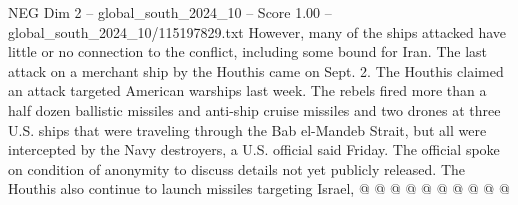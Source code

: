 \begin{textsample}{NEG Dim 2 – global\_south\_2024\_10 – Score 1.00 – global\_south\_2024\_10/115197829.txt}
However, many of the ships attacked have little or no connection to the conflict, including some bound for Iran.
The last attack on a merchant ship by the Houthis came on Sept. 2.
The Houthis claimed an attack targeted American warships last week.
The rebels fired more than a half dozen ballistic missiles and anti-ship cruise missiles and two drones at three U.S. ships that were traveling through the Bab el-Mandeb Strait, but all were intercepted by the Navy destroyers, a U.S. official said Friday.
The official spoke on condition of anonymity to discuss details not yet publicly released.
The Houthis also continue to launch missiles targeting Israel, @ @ @ @ @ @ @ @ @ @

\end{textsample}

